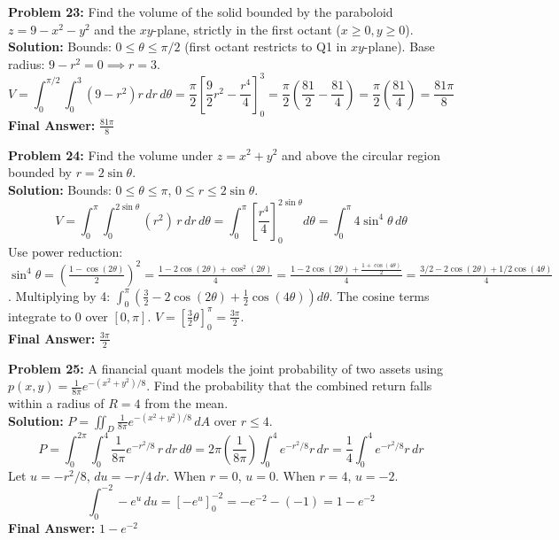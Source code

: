 \documentclass[11pt]{article}
\begin{document}
\vspace{0.5cm}
\textbf{Problem 23:} Find the volume of the solid bounded by the paraboloid $z = 9 - x^2 - y^2$ and the $xy$-plane, strictly in the first octant ($x \ge 0, y \ge 0$).
\\
\textbf{Solution:}
Bounds: $0 \le \theta \le \pi/2$ (first octant restricts to Q1 in $xy$-plane). Base radius: $9 - r^2 = 0 \implies r = 3$.
$$ V = \int_0^{\pi/2} \int_0^3 (9 - r^2) r \, dr \, d\theta = \frac{\pi}{2} \left[ \frac{9}{2}r^2 - \frac{r^4}{4} \right]_0^3 = \frac{\pi}{2} \left( \frac{81}{2} - \frac{81}{4} \right) = \frac{\pi}{2} \left( \frac{81}{4} \right) = \frac{81\pi}{8} $$
\textbf{Final Answer:} $\frac{81\pi}{8}$

\vspace{0.5cm}
\textbf{Problem 24:} Find the volume under $z = x^2+y^2$ and above the circular region bounded by $r = 2\sin\theta$.
\\
\textbf{Solution:}
Bounds: $0 \le \theta \le \pi$, $0 \le r \le 2\sin\theta$.
$$ V = \int_0^\pi \int_0^{2\sin\theta} (r^2) \, r \, dr \, d\theta = \int_0^\pi \left[ \frac{r^4}{4} \right]_0^{2\sin\theta} d\theta = \int_0^\pi 4\sin^4\theta \, d\theta $$
Use power reduction: $\sin^4\theta = \left(\frac{1-\cos(2\theta)}{2}\right)^2 = \frac{1 - 2\cos(2\theta) + \cos^2(2\theta)}{4} = \frac{1 - 2\cos(2\theta) + \frac{1+\cos(4\theta)}{2}}{4} = \frac{3/2 - 2\cos(2\theta) + 1/2\cos(4\theta)}{4}$. 
Multiplying by 4: $\int_0^\pi \left( \frac{3}{2} - 2\cos(2\theta) + \frac{1}{2}\cos(4\theta) \right) d\theta$.
The cosine terms integrate to 0 over $[0, \pi]$.
$V = \left[ \frac{3}{2}\theta \right]_0^\pi = \frac{3\pi}{2} $.
\\
\textbf{Final Answer:} $\frac{3\pi}{2}$

\vspace{0.5cm}
\textbf{Problem 25:} A financial quant models the joint probability of two assets using $p(x,y) = \frac{1}{8\pi} e^{-(x^2+y^2)/8}$. Find the probability that the combined return falls within a radius of $R=4$ from the mean.
\\
\textbf{Solution:}
$P = \iint_D \frac{1}{8\pi} e^{-(x^2+y^2)/8} \, dA$ over $r \le 4$.
$$ P = \int_0^{2\pi} \int_0^4 \frac{1}{8\pi} e^{-r^2/8} \, r \, dr \, d\theta = 2\pi \left( \frac{1}{8\pi} \right) \int_0^4 e^{-r^2/8} r \, dr = \frac{1}{4} \int_0^4 e^{-r^2/8} r \, dr $$
Let $u = -r^2/8$, $du = -r/4 \, dr$. When $r=0$, $u=0$. When $r=4$, $u=-2$.
$$ \int_0^{-2} -e^u \, du = \left[ -e^u \right]_0^{-2} = -e^{-2} - (-1) = 1 - e^{-2} $$
\textbf{Final Answer:} $1 - e^{-2}$
\end{document}
